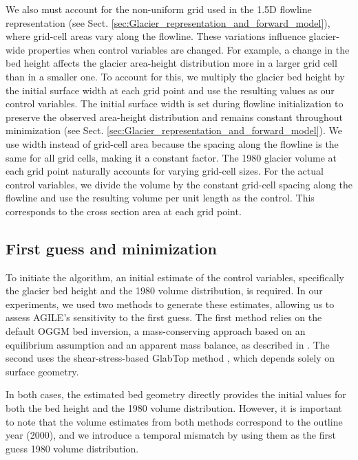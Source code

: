 \documentclass[journal abbreviation, manuscript]{copernicus}
\begin{document}
We also must account for the non-uniform grid used in the 1.5D flowline representation (see Sect. \ref{sec:Glacier_representation_and_forward_model}), where grid-cell areas vary along the flowline. These variations influence glacier-wide properties when control variables are changed. For example, a change in the bed height affects the glacier area-height distribution more in a larger grid cell than in a smaller one. To account for this, we multiply the glacier bed height by the initial surface width at each grid point and use the resulting values as our control variables. The initial surface width is set during flowline initialization to preserve the observed area-height distribution and remains constant throughout minimization (see Sect. \ref{sec:Glacier_representation_and_forward_model}). We use width instead of grid-cell area because the spacing along the flowline is the same for all grid cells, making it a constant factor. The 1980 glacier volume at each grid point naturally accounts for varying grid-cell sizes. For the actual control variables, we divide the volume by the constant grid-cell spacing along the flowline and use the resulting volume per unit length as the control. This corresponds to the cross section area at each grid point.


\subsection{First guess and minimization}
\label{sec:first_guess_method}

To initiate the algorithm, an initial estimate of the control variables, specifically the glacier bed height and the 1980 volume distribution, is required. In our experiments, we used two methods to generate these estimates, allowing us to assess AGILE’s sensitivity to the first guess. The first method relies on the default OGGM bed inversion, a mass-conserving approach based on an equilibrium assumption and an apparent mass balance, as described in \citet{Maussion2019}. The second uses the shear-stress-based GlabTop method \citep{Linsbauer2012}, which depends solely on surface geometry.

In both cases, the estimated bed geometry directly provides the initial values for both the bed height and the 1980 volume distribution. However, it is important to note that the volume estimates from both methods correspond to the outline year (2000), and we introduce a temporal mismatch by using them as the first guess 1980 volume distribution.
\end{document}

